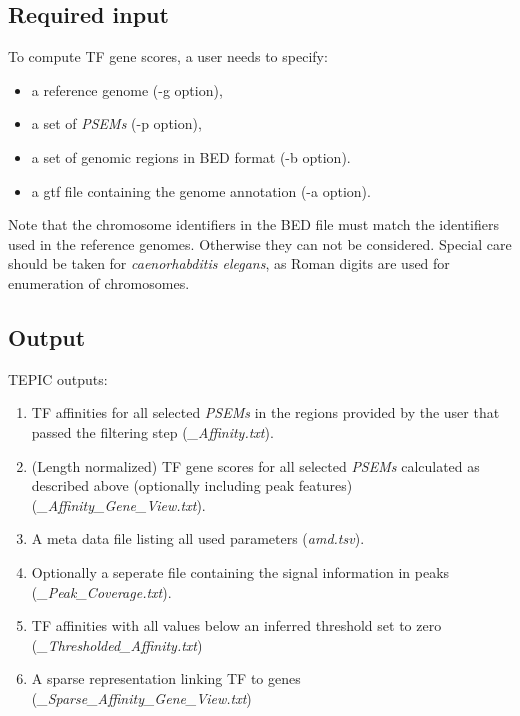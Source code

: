 \documentclass{article}
\begin{document}
\subsection{Required input}
To compute TF gene scores, a user needs to specify:
\begin{itemize}
\item a reference genome (-g option),
\item a set of \textit{PSEMs} (-p option),
\item a set of genomic regions in BED format (-b option).
\item a gtf file containing the genome annotation (-a option).
\end{itemize}
Note that the chromosome identifiers in the BED file must match the identifiers used in the reference genomes. Otherwise they can not be considered. 
Special care should be taken for \textit{caenorhabditis elegans}, as Roman digits are used for enumeration of chromosomes.

\subsection{Output}
TEPIC outputs:
\begin{enumerate}
\item TF affinities for all selected \textit{PSEMs} in the regions provided by the user that passed the filtering step (\textit{\*\_Affinity.txt}). 
\item (Length normalized) TF gene scores for all selected \textit{PSEMs} calculated as described above (optionally including peak features) (\textit{\*\_Affinity\_Gene\_View.txt}). 
\item A meta data file listing all used parameters (\textit{amd.tsv}).
\item Optionally a seperate file containing the signal information in peaks (\textit{\*\_Peak\_Coverage.txt}). 
\item TF affinities with all values below an inferred threshold set to zero (\textit{\*\_Thresholded\_Affinity.txt})
\item A sparse representation linking TF to genes (\textit{\*\_Sparse\_Affinity\_Gene\_View.txt})
\end{enumerate}

\newpage
\end{document}
